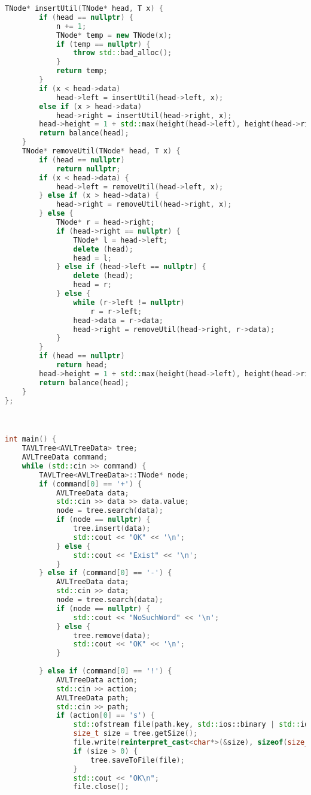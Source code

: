 \documentclass[12pt]{article}
\begin{document}
\begin{lstlisting}[language=C++]
    TNode* insertUtil(TNode* head, T x) {
        if (head == nullptr) {
            n += 1;
            TNode* temp = new TNode(x);
            if (temp == nullptr) {
                throw std::bad_alloc();
            }
            return temp;
        }
        if (x < head->data)
            head->left = insertUtil(head->left, x);
        else if (x > head->data)
            head->right = insertUtil(head->right, x);
        head->height = 1 + std::max(height(head->left), height(head->right));
        return balance(head);
    }
    TNode* removeUtil(TNode* head, T x) {
        if (head == nullptr)
            return nullptr;
        if (x < head->data) {
            head->left = removeUtil(head->left, x);
        } else if (x > head->data) {
            head->right = removeUtil(head->right, x);
        } else {
            TNode* r = head->right;
            if (head->right == nullptr) {
                TNode* l = head->left;
                delete (head);
                head = l;
            } else if (head->left == nullptr) {
                delete (head);
                head = r;
            } else {
                while (r->left != nullptr)
                    r = r->left;
                head->data = r->data;
                head->right = removeUtil(head->right, r->data);
            }
        }
        if (head == nullptr)
            return head;
        head->height = 1 + std::max(height(head->left), height(head->right));
        return balance(head);
    }
};



int main() {
    TAVLTree<AVLTreeData> tree;
    AVLTreeData command;
    while (std::cin >> command) {
        TAVLTree<AVLTreeData>::TNode* node;
        if (command[0] == '+') {
            AVLTreeData data;
            std::cin >> data >> data.value;
            node = tree.search(data);
            if (node == nullptr) {
                tree.insert(data);
                std::cout << "OK" << '\n';
            } else {
                std::cout << "Exist" << '\n';
            }
        } else if (command[0] == '-') {
            AVLTreeData data;
            std::cin >> data;
            node = tree.search(data);
            if (node == nullptr) {
                std::cout << "NoSuchWord" << '\n';
            } else {
                tree.remove(data);
                std::cout << "OK" << '\n';
            }
        
        } else if (command[0] == '!') {
            AVLTreeData action;
            std::cin >> action;
            AVLTreeData path;
            std::cin >> path;
            if (action[0] == 's') {   
                std::ofstream file(path.key, std::ios::binary | std::ios::trunc);
                size_t size = tree.getSize();
                file.write(reinterpret_cast<char*>(&size), sizeof(size_t));
                if (size > 0) {
                    tree.saveToFile(file);
                }
                std::cout << "OK\n";
                file.close();


\end{lstlisting}
\end{document}
